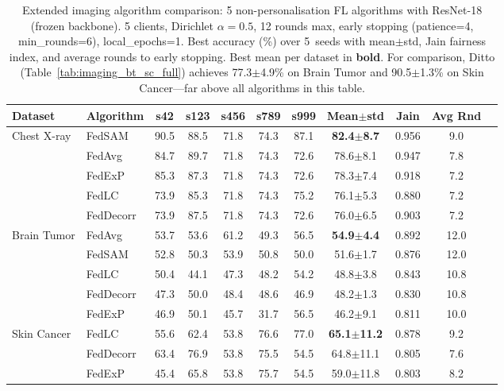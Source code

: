 \documentclass[conference]{IEEEtran}
\begin{document}
\begin{table}[htbp]
\centering
\caption{Extended imaging algorithm comparison: 5 non-personalisation FL algorithms with ResNet-18 (frozen backbone). 5 clients, Dirichlet $\alpha{=}0.5$, 12 rounds max, early stopping (patience=4, min\_rounds=6), local\_epochs=1. Best accuracy (\%) over 5~seeds with mean$\pm$std, Jain fairness index, and average rounds to early stopping. Best mean per dataset in \textbf{bold}. For comparison, Ditto (Table~\ref{tab:imaging_bt_sc_full}) achieves 77.3$\pm$4.9\% on Brain Tumor and 90.5$\pm$1.3\% on Skin Cancer---far above all algorithms in this table.}
\label{tab:imaging_extended_algos}
\small
\begin{tabular}{llccccccccc}
\toprule
\textbf{Dataset} & \textbf{Algorithm} & \textbf{s42} & \textbf{s123} & \textbf{s456} & \textbf{s789} & \textbf{s999} & \textbf{Mean$\pm$std} & \textbf{Jain} & \textbf{Avg Rnd} \\
\midrule
\multirow{5}{*}{Chest X-ray}
 & FedSAM & 90.5 & 88.5 & 71.8 & 74.3 & 87.1 & \textbf{82.4$\pm$8.7} & 0.956 & 9.0 \\
 & FedAvg & 84.7 & 89.7 & 71.8 & 74.3 & 72.6 & 78.6$\pm$8.1 & 0.947 & 7.8 \\
 & FedExP & 85.3 & 87.3 & 71.8 & 74.3 & 72.6 & 78.3$\pm$7.4 & 0.918 & 7.2 \\
 & FedLC & 73.9 & 85.3 & 71.8 & 74.3 & 75.2 & 76.1$\pm$5.3 & 0.880 & 7.2 \\
 & FedDecorr & 73.9 & 87.5 & 71.8 & 74.3 & 72.6 & 76.0$\pm$6.5 & 0.903 & 7.2 \\
\midrule
\multirow{5}{*}{Brain Tumor}
 & FedAvg & 53.7 & 53.6 & 61.2 & 49.3 & 56.5 & \textbf{54.9$\pm$4.4} & 0.892 & 12.0 \\
 & FedSAM & 52.8 & 50.3 & 53.9 & 50.8 & 50.0 & 51.6$\pm$1.7 & 0.876 & 12.0 \\
 & FedLC & 50.4 & 44.1 & 47.3 & 48.2 & 54.2 & 48.8$\pm$3.8 & 0.843 & 10.8 \\
 & FedDecorr & 47.3 & 50.0 & 48.4 & 48.6 & 46.9 & 48.2$\pm$1.3 & 0.830 & 10.8 \\
 & FedExP & 46.9 & 50.1 & 45.7 & 31.7 & 56.5 & 46.2$\pm$9.1 & 0.811 & 10.0 \\
\midrule
\multirow{5}{*}{Skin Cancer}
 & FedLC & 55.6 & 62.4 & 53.8 & 76.6 & 77.0 & \textbf{65.1$\pm$11.2} & 0.878 & 9.2 \\
 & FedDecorr & 63.4 & 76.9 & 53.8 & 75.5 & 54.5 & 64.8$\pm$11.1 & 0.805 & 7.6 \\
 & FedExP & 45.4 & 65.8 & 53.8 & 75.7 & 54.5 & 59.0$\pm$11.8 & 0.803 & 8.2 \\

\end{tabular}
\end{table}
\end{document}
